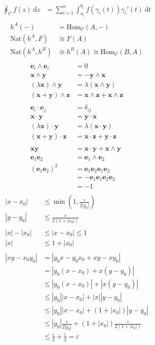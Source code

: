 \documentclass[a4paper,11pt]{article}
\theoremstyle{plain}
\theoremstyle{definition}
\newcommand{\dx}{\text{d}}
\begin{document}
\begin{align*}
	\oint_C f(z)\ \dx z &= \sum_{i=1}^n \int_{a_i}^{b_i} f(\gamma_i(t))\gamma_i '(t)\ \dx t \\
\end{align*}
\begin{align*}
	h^A(-) &= \text{Hom}_{\mathcal{C}}(A,-) \\
	\text{Nat}(h^A,F) &\cong F(A) \\
	\text{Nat}(h^A,h^B) &\cong h^B(A) \cong \text{Hom}_{\mathcal{C}}(B,A)\\
\end{align*}
\newpage
\begin{align*}
	\mathbf{e}_i\wedge\mathbf{e}_i &= 0 \\
	\mathbf{x}\wedge\mathbf{y} &= -\mathbf{y}\wedge\mathbf{x} \\
	(\lambda\mathbf{x})\wedge\mathbf{y} &= \lambda(\mathbf{x}\wedge\mathbf{y}) \\
	(\mathbf{x}+\mathbf{y})\wedge\mathbf{z}
	&= \mathbf{x}\wedge\mathbf{z}+\mathbf{x}\wedge\mathbf{z} \\
	\\
	\mathbf{e}_i\cdot \mathbf{e}_j &= {\delta}_{ij} \\
	\mathbf{x}\cdot\mathbf{y} &= \mathbf{y}\cdot\mathbf{x} \\
	(\lambda\mathbf{x})\cdot\mathbf{y} &= \lambda(\mathbf{x}\cdot\mathbf{y})\\
	(\mathbf{x}+\mathbf{y})\cdot\mathbf{z} &=
	\mathbf{x}\cdot\mathbf{z}+\mathbf{y}\cdot\mathbf{z}\\
	\\
	\mathbf{x}\mathbf{y} &= \mathbf{x}\cdot\mathbf{y}+\mathbf{x}\wedge\mathbf{y}
	\\
	\mathbf{e}_1\mathbf{e}_2 &=  \mathbf{e}_1\wedge\mathbf{e}_2 \\
	(\mathbf{e}_1\mathbf{e}_2)^2
	&= \mathbf{e}_1\mathbf{e}_2\mathbf{e}_1\mathbf{e}_2 \\
	&=-\mathbf{e}_1\mathbf{e}_1\mathbf{e}_2\mathbf{e}_2 \\
	&=-1 \\
\end{align*}
\newpage
\begin{align*}
	|x-x_0| &\leq \min\left(1,\frac{\varepsilon}{2|y_0|}\right) \\
	|y-y_0| &\leq \frac{\varepsilon}{2(1+|x_0|)} \\
	\\
	|x|-|x_0| &\leq |x-x_0| \leq 1 \\
	|x| &\leq  1+|x_0| \\
	\\
	|xy-x_0y_0|&= |y_0x-y_0x_0+xy-xy_0|\\
	&= |y_0(x-x_0)+x(y-y_0)|\\
	&\leq |y_0(x-x_0)|+|x(y-y_0)|\\
	&\leq |y_0||x-x_0|+|x||y-y_0|\\
	&\leq |y_0||x-x_0|+(1+|x_0|)|y-y_0|\\
	&\leq |y_0|\frac{\varepsilon}{2|y_0|}
	      +(1+|x_0|)\frac{\varepsilon}{2(1+|x_0|)}\\
	&\leq \frac{\varepsilon}{2}+\frac{\varepsilon}{2}=\varepsilon\\
\end{align*}
\end{document}
